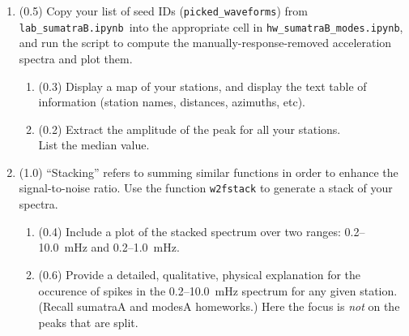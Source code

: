 \documentclass[11pt,titlepage,fleqn]{article}
\newcommand{\tfilemodes}{{\tt hw\_sumatraB\_modes.ipynb}}
\newcommand{\tfilelab}{{\tt lab\_sumatraB.ipynb}}
\begin{document}
\begin{enumerate}

\item (0.5) Copy your list of seed IDs (\verb+picked_waveforms+) from \tfilelab\ into the appropriate cell in \tfilemodes, and run the script to compute the manually-response-removed acceleration spectra and plot them.
%
\begin{enumerate}
\item (0.3) %
Display a map of your stations, and display the text table of information (station names, distances, azimuths, etc).

\item (0.2) Extract the amplitude of the  peak for all your stations. \\
List the median value.
\end{enumerate}


\item (1.0) ``Stacking'' refers to summing similar functions in order to enhance the signal-to-noise ratio. Use the function \verb+w2fstack+ to generate a stack of your spectra.
%
\begin{enumerate}
\item (0.4) Include a plot of the stacked spectrum over two ranges: 0.2--10.0~mHz and 0.2--1.0~mHz.
\item (0.6) Provide a detailed, qualitative, physical explanation for the occurence of spikes in the 0.2--10.0~mHz spectrum for any given station. (Recall sumatraA and modesA homeworks.) Here the focus is {\em not} on the peaks that are split.
\end{enumerate}
%



\end{enumerate}
\end{document}
